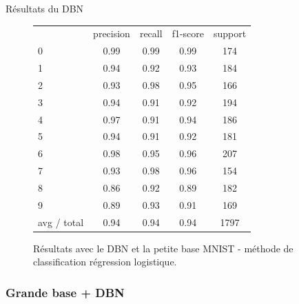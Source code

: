 \begin{frame}{Résultats du DBN}
	\begin{figure}[ht!]
	\centering
	\begin{tabular}{l|c|c|c|c}
	& precision   & recall  &f1-score &  support \\
          0&       0.99&      0.99&      0.99    &   174 \\
          1 &      0.94 &     0.92 &     0.93    &   184\\
          2  &     0.93  &    0.98  &    0.95       &166\\
          3   &    0.94   &   0.91   &   0.92       &194\\
          4    &   0.97    &  0.91    &  0.94      & 186\\
          5     &  0.94     & 0.91     & 0.92     &  181\\
          6      & 0.98      &0.95      &0.96    &   207\\
          7       &0.93&      0.98&      0.96   &    154\\
          8&       0.86 &     0.92 &     0.89  &     182\\
          9 &      0.89  &    0.93  &    0.91 &      169\\
avg / total  &     0.94   &   0.94   &   0.94&      1797\\
	\end{tabular}
	\caption{Résultats avec le DBN et la petite base MNIST - méthode de classification régression logistique.}
	\end{figure} 
\end{frame}

\subsubsection*{Grande base + DBN}



